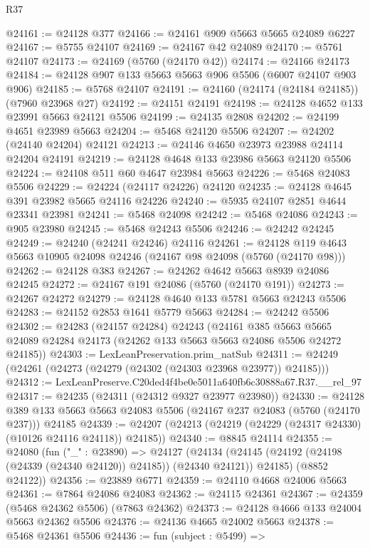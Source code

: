 \begin{lexlean}{R37}
\begin{coremodule}
@24161 := @24128 @377
@24166 := @24161 @909 @5663 @5665 @24089 @6227
@24167 := @5755 @24107
@24169 := @24167 @42 @24089
@24170 := @5761 @24107
@24173 := @24169 (@5760 (@24170 @42))
@24174 := @24166 @24173
@24184 := @24128 @907 @133 @5663 @5663 @906 @5506 (@6007 @24107 @903 @906)
@24185 := @5768 @24107
@24191 := @24160 (@24174 (@24184 @24185)) (@7960 @23968 @27)
@24192 := @24151 @24191
@24198 := @24128 @4652 @133 @23991 @5663 @24121 @5506
@24199 := @24135 @2808
@24202 := @24199 @4651 @23989 @5663
@24204 := @5468 @24120 @5506
@24207 := @24202 (@24140 @24204) @24121
@24213 := @24146 @4650 @23973 @23988 @24114 @24204 @24191
@24219 := @24128 @4648 @133 @23986 @5663 @24120 @5506
@24224 := @24108 @511 @60 @4647 @23984 @5663
@24226 := @5468 @24083 @5506
@24229 := @24224 (@24117 @24226) @24120
@24235 := @24128 @4645 @391 @23982 @5665 @24116 @24226
@24240 := @5935 @24107 @2851 @4644 @23341 @23981
@24241 := @5468 @24098
@24242 := @5468 @24086
@24243 := @905 @23980
@24245 := @5468 @24243 @5506
@24246 := @24242 @24245
@24249 := @24240 (@24241 @24246) @24116
@24261 := @24128 @119 @4643 @5663 @10905 @24098 @24246 (@24167 @98 @24098 (@5760 (@24170 @98)))
@24262 := @24128 @383
@24267 := @24262 @4642 @5663 @8939 @24086 @24245
@24272 := @24167 @191 @24086 (@5760 (@24170 @191))
@24273 := @24267 @24272
@24279 := @24128 @4640 @133 @5781 @5663 @24243 @5506
@24283 := @24152 @2853 @1641 @5779 @5663
@24284 := @24242 @5506
@24302 := @24283
    (@24157 @24284)
    @24243
    (@24161
      @385
      @5663
      @5665
      @24089
      @24284
      @24173
      (@24262 @133 @5663 @5663 @24086 @5506 @24272 @24185))
@24303 := LexLeanPreservation.prim_natSub
@24311 := @24249 (@24261 (@24273 (@24279 (@24302 (@24303 @23968 @23977)) @24185)))
@24312 := LexLeanPreserve.C20ded4f4be0e5011a640fb6c30888a67.R37.__rel_97
@24317 := @24235 (@24311 (@24312 @9327 @23977 @23980))
@24330 := @24128
    @389
    @133
    @5663
    @5663
    @24083
    @5506
    (@24167 @237 @24083 (@5760 (@24170 @237)))
    @24185
@24339 := @24207 (@24213 (@24219 (@24229 (@24317 @24330) (@10126 @24116 @24118)) @24185))
@24340 := @8845 @24114
@24355 := @24080
    (fun ("_" : @23890) =>
    @24127
      (@24134 (@24145 (@24192 (@24198 (@24339 (@24340 @24120)) @24185)) (@24340 @24121)) @24185)
      (@8852 @24122))
@24356 := @23889 @6771
@24359 := @24110 @4668 @24006 @5663
@24361 := @7864 @24086 @24083
@24362 := @24115 @24361
@24367 := @24359 (@5468 @24362 @5506) (@7863 @24362)
@24373 := @24128 @4666 @133 @24004 @5663 @24362 @5506
@24376 := @24136 @4665 @24002 @5663
@24378 := @5468 @24361 @5506
@24436 := fun (subject : @5499) =>

\end{coremodule}
\end{lexlean}
